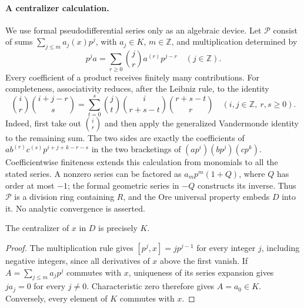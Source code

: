 \paragraph{A centralizer calculation.}
We use formal pseudodifferential series only as an algebraic device. Let
\(\mathcal P\) consist of sums \(\sum_{j\le m}a_j(x)p^j\), with
\(a_j\in K\), \(m\in\mathbb Z\), and multiplication determined by
\[
 p^j a=\sum_{r\ge0}\binom{j}{r}a^{(r)}p^{j-r}
 \quad(j\in\mathbb Z).
\]
Every coefficient of a product receives finitely many contributions. For
completeness, associativity reduces, after the Leibniz rule, to the identity
\[
 \binom{i}{r}\binom{i+j-r}{s}
 =\sum_{t=0}^{s}\binom{j}{t}\binom{i}{r+s-t}
                         \binom{r+s-t}{r}
 \quad(i,j\in\mathbb Z,\ r,s\ge0).
\]
Indeed, first take out \(\binom{i}{r}\) and then apply the generalized
Vandermonde identity to the remaining sum. The two sides are exactly the
coefficients of \(a b^{(r)}c^{(s)}p^{i+j+k-r-s}\) in the two bracketings
of \((ap^i)(bp^j)(cp^k)\). Coefficientwise finiteness extends this calculation
from monomials to all the stated series.
A nonzero series can be factored as \(a_mp^m(1+Q)\), where \(Q\) has order
at most \(-1\); the formal geometric series in \(-Q\) constructs its inverse.
Thus \(\mathcal P\) is a division ring containing \(R\), and the Ore
universal property embeds \(D\) into it. No analytic convergence is asserted.

\begin{lemma}
The centralizer of \(x\) in \(D\) is precisely \(K\).
\end{lemma}
\begin{proof}
The multiplication rule gives \([p^j,x]=jp^{j-1}\) for every integer \(j\),
including negative integers, since all derivatives of \(x\) above the first
vanish. If \(A=\sum_{j\le m}a_jp^j\) commutes with \(x\), uniqueness of its
series expansion gives \(ja_j=0\) for every \(j\ne0\). Characteristic zero
therefore gives \(A=a_0\in K\). Conversely, every element of \(K\) commutes
with \(x\).
\end{proof}

